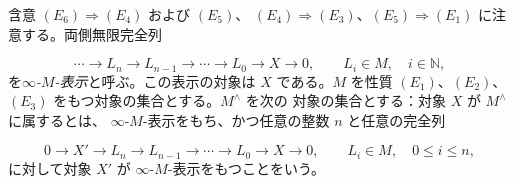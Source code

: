 含意 $(E_6)\Rightarrow(E_4)$ および $(E_5)$、
$(E_4)\Rightarrow(E_3)$、$(E_5)\Rightarrow(E_1)$ に注意する。両側無限完全列

\[
\cdots\longrightarrow L_n\longrightarrow L_{n-1}\longrightarrow\cdots
\longrightarrow L_0\longrightarrow X\longrightarrow0,
\qquad L_i\in M,\quad i\in\mathbb N,
\]
を\emph{$\infty$-$M$-表示}と呼ぶ。この表示の対象は $X$ である。$M$ を性質
$(E_1)$、$(E_2)$、$(E_3)$ をもつ対象の集合とする。$M^{\wedge}$ を次の
対象の集合とする：対象 $X$ が $M^{\wedge}$ に属するとは、
$\infty$-$M$-表示をもち、かつ任意の整数 $n$ と任意の完全列

\[
0\longrightarrow X'\longrightarrow L_n\longrightarrow L_{n-1}
\longrightarrow\cdots\longrightarrow L_0\longrightarrow X\longrightarrow0,
\qquad L_i\in M,\quad 0\le i\le n,
\]
に対して対象 $X'$ が $\infty$-$M$-表示をもつことをいう。
\endgroup
